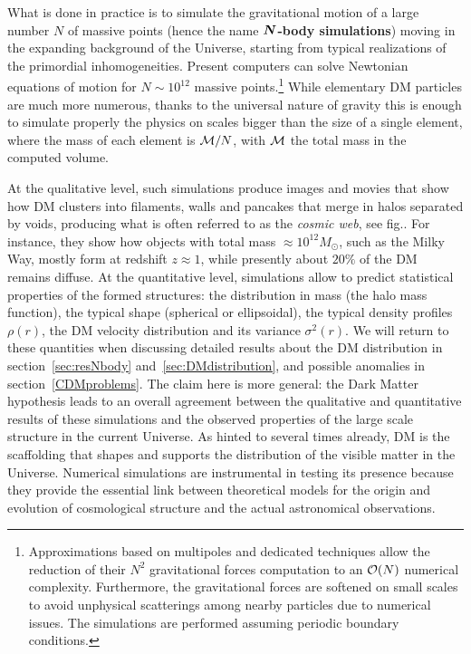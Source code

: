 What is done in practice is to simulate the gravitational motion of a large number $N$ of massive points (hence the name {\bf $\bm{N}$-body simulations}) moving in the expanding background of the Universe, starting from typical realizations of the primordial inhomogeneities.
Present computers can solve Newtonian equations of motion for $N\sim 10^{12}$ massive points.\footnote{Approximations based on multipoles and dedicated techniques 
allow the reduction of their $N^2$ gravitational forces computation to an ${\cal O}(N)$ numerical complexity.
Furthermore, the gravitational forces are softened on small scales to avoid
unphysical scatterings among nearby particles due to numerical issues.
The simulations are performed assuming periodic boundary conditions.}
While elementary DM particles are much more numerous, 
thanks to the universal nature of gravity this is enough to simulate properly the physics on scales bigger than the size of a single element,
where the mass of each element is ${\cal M}/N$, with ${\cal M}$ the total mass in the computed volume.

At the qualitative level, such simulations produce images and movies that show how DM clusters into filaments, walls and pancakes that merge in halos separated by voids, producing what is often referred to as the {\em cosmic web}, see fig.. 
For instance, they show how objects with total mass $\approx 10^{12}M_\odot$, such as the Milky Way, mostly form at redshift $z\approx 1$, while presently about $20\%$ of the DM remains diffuse.
At the quantitative level, simulations allow to predict statistical properties of the formed structures:
the distribution in mass (the halo mass function), the typical shape (spherical or ellipsoidal), the typical density profiles $\rho(r)$, the DM velocity distribution and its variance $\sigma^2(r)$.
We will return to these quantities when discussing detailed results about the DM distribution in section~\ref{sec:resNbody} and~\ref{sec:DMdistribution},
and possible anomalies in section~\ref{CDMproblems}. 
The claim here is more general: the Dark Matter hypothesis leads to an
overall agreement between the qualitative and quantitative results of these simulations and the observed properties of the large scale structure in the current Universe.
As hinted to several times already, DM is the scaffolding that shapes and supports the distribution of the visible matter in the Universe. Numerical simulations are instrumental in testing its presence because they provide the essential link between theoretical models for the origin and evolution of cosmological structure and the actual astronomical observations.


